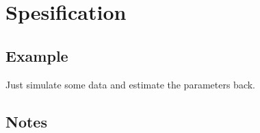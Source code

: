 \documentclass[a4paper,11pt]{article}
\begin{document}
\section*{Spesification}



\subsection*{Example}

Just simulate some data and estimate the parameters back. 

{\small}

\subsection*{Notes}
\end{document}

